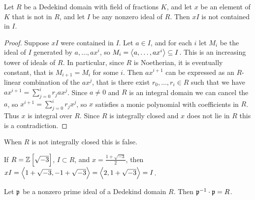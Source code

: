 \begin{lemma}
\label{lem:11.1.7}
Let $ R $ be a Dedekind domain with field of fractions $ K $, and let $ x $ be an element of $ K $ that is not in $ R $, and let $ I $ be any nonzero ideal of $ R $. Then $ xI $ is not contained in $ I $.
\end{lemma}

\begin{proof}
Suppose $ xI $ were contained in $ I $. Let $ a \in I $, and for each $ i $ let $ M_i $ be the ideal of $ I $ generated by $ a, \dots, ax^i $, so $ M_i = \left\langle a, \dots, ax^i \right\rangle \subseteq I $. This is an increasing tower of ideals of $ R $. In particular, since $ R $ is Noetherian, it is eventually constant, that is $ M_{i + 1} = M_i $ for some $ i $. Then $ ax^{i + 1} $ can be expressed as an $ R $-linear combination of the $ ax^j $, that is there exist $ r_0, \dots, r_i \in R $ such that we have $ ax^{i + 1} = \sum_{j = 0}^i r_jax^j $. Since $ a \ne 0 $ and $ R $ is an integral domain we can cancel the $ a $, so $ x^{i + 1} = \sum_{j = 0}^i r_jx^j $, so $ x $ satisfies a monic polynomial with coefficients in $ R $. Thus $ x $ is integral over $ R $. Since $ R $ is integrally closed and $ x $ does not lie in $ R $ this is a contradiction.
\end{proof}

When $ R $ is not integrally closed this is false.

\begin{example*}
If $ R = \ZZ\sbr{\sqrt{-3}} $, $ I \subset R $, and $ x = \tfrac{1 + \sqrt{-3}}{2} $, then $ xI = \left\langle 1 + \sqrt{-3}, -1 + \sqrt{-3} \right\rangle = \left\langle 2, 1 + \sqrt{-3} \right\rangle = I $.
\end{example*}

\begin{proposition}
\label{prop:11.1.8}
Let $ \mathfrak{p} $ be a nonzero prime ideal of a Dedekind domain $ R $. Then $ \mathfrak{p}^{-1} \cdot \mathfrak{p} = R $.
\end{proposition}

